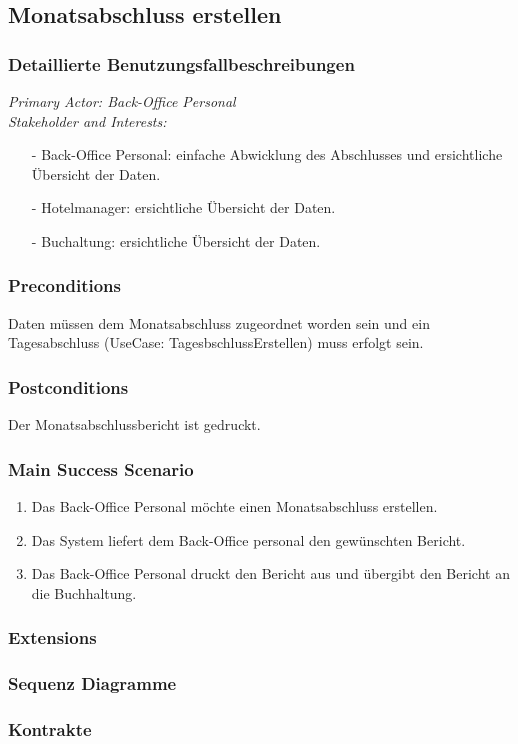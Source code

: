 \documentclass[./detailed_overview_usecases.tex]{subfiles}
\begin{document}
    \subsection{Monatsabschluss erstellen}
    \subsubsection{Detaillierte Benutzungsfallbeschreibungen}
    \textit{Primary Actor: Back-Office Personal}
    \\
    \textit{Stakeholder and Interests:}
    \begin{itemize}
        \item[-] Back-Office Personal: einfache Abwicklung des Abschlusses und ersichtliche Übersicht der Daten.
        \item[-] Hotelmanager: ersichtliche Übersicht der Daten.
        \item[-] Buchaltung: ersichtliche Übersicht der Daten.
    \end{itemize}

    \subsubsection*{Preconditions}
    Daten müssen dem Monatsabschluss zugeordnet worden sein und ein Tagesabschluss (UseCase: TagesbschlussErstellen) muss erfolgt sein.
    \subsubsection*{Postconditions}
    Der Monatsabschlussbericht ist gedruckt.

    \subsubsection*{Main Success Scenario}
    \begin{enumerate}
        \item Das Back-Office Personal möchte einen Monatsabschluss erstellen.
        \item Das System liefert dem Back-Office personal den gewünschten Bericht.
        \item Das Back-Office Personal druckt den Bericht aus und übergibt den Bericht an die Buchhaltung.
    \end{enumerate}

    \subsubsection*{Extensions}
    \subsubsection{Sequenz Diagramme}
    \subsubsection{Kontrakte}
\end{document}
